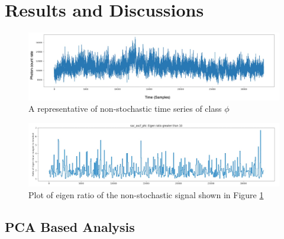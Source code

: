 \documentclass[10pt,conference]{IEEEtran}
\begin{document}
\section{Results and Discussions}


\begin{figure}[ht]
  \centering
  \includegraphics[width=0.9\linewidth]{phi_ts_edited.drawio.png}
  \caption{A representative of non-stochastic time series of class $\phi$}
  \label{phi_ts}
  \end{figure}

\begin{figure}[ht]

  \centering
  \includegraphics[width=0.9\linewidth]{phi_ts_eig.png}
  \caption{Plot of eigen ratio of the non-stochastic signal shown in Figure \ref{phi_ts}}
  \label{phi_eig}
\end{figure}

\subsection{PCA Based Analysis}
\end{document}
